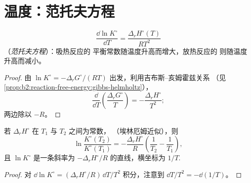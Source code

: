 \section{温度：范托夫方程}

\begin{theorem}[范托夫方程]\label{thm:b2:equilibrium-shifts:vant-hoff}
\[
  \frac{\dd\ln K^\circ}{\dd T} = \frac{\Delta_r H^\circ(T)}{RT^2}
\]
（\emph{范托夫方程}）：吸热反应的
平衡常数随温度升高而增大，放热反应的
则随温度升高而减小。
\end{theorem}

\begin{proof}
由 $\ln K^\circ = -\Delta_r G^\circ/(RT)$ 出发，利用吉布斯–亥姆霍兹关系
（见\cref{prop:b2:reaction-free-energy:gibbs-helmholtz}），
\[
  \frac{\dd}{\dd T}\left(\frac{\Delta_r G^\circ}{T}\right) =
  -\frac{\Delta_r H^\circ}{T^2} ;
\]
两边除以 $-R$。
\end{proof}

\begin{proposition}[积分形式]\label{prop:b2:equilibrium-shifts:integrated}
若 $\Delta_r H^\circ$ 在 $T_1$ 与 $T_2$ 之间为常数，
（埃林厄姆近似），则
\[
  \ln\frac{K^\circ(T_2)}{K^\circ(T_1)} = -\frac{\Delta_r H^\circ}{R}\left(
  \frac{1}{T_2} - \frac{1}{T_1}\right),
\]
且 $\ln K^\circ$ 是一条斜率为 $-\Delta_r H^\circ/R$ 的直线，横坐标为
$1/T$.
\end{proposition}

\begin{proof}
对 $\dd\ln K^\circ = (\Delta_r H^\circ/R)\,\dd T/T^2$ 积分，注意到
$\dd T/T^2 = -\dd(1/T)$。
\end{proof}

